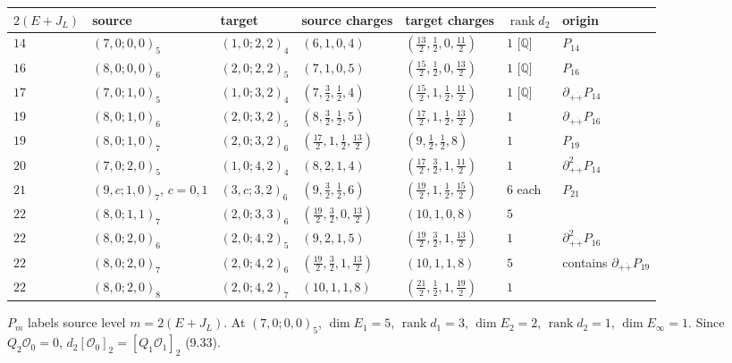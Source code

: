 \documentclass[11pt]{article}
\numberwithin{equation}{section}
\numberwithin{figure}{section}
\numberwithin{table}{section}
\begin{document}
{\small\renewcommand{\arraystretch}{1.25}\setlength{\tabcolsep}{4pt}
\begin{xltabular}{\linewidth}{@{}l>{\raggedright\arraybackslash}Xlllll@{}}
\toprule
$2(E+J_L)$ & source & target & source charges & target charges & $\operatorname{rank}d_2$ & origin\\
\midrule\endhead
$14$ & $(7,0;0,0)_5$ & $(1,0;2,2)_4$ & $(6,1,0,4)$ & $(\tfrac{13}2,\tfrac12,0,\tfrac{11}2)$ & $1$ [$\mathbb Q$] & $P_{14}$\\
$16$ & $(8,0;0,0)_6$ & $(2,0;2,2)_5$ & $(7,1,0,5)$ & $(\tfrac{15}2,\tfrac12,0,\tfrac{13}2)$ & $1$ [$\mathbb Q$] & $P_{16}$\\
$17$ & $(7,0;1,0)_5$ & $(1,0;3,2)_4$ & $(7,\tfrac32,\tfrac12,4)$ & $(\tfrac{15}2,1,\tfrac12,\tfrac{11}2)$ & $1$ [$\mathbb Q$] & $\partial_{+\dot+}P_{14}$\\
$19$ & $(8,0;1,0)_6$ & $(2,0;3,2)_5$ & $(8,\tfrac32,\tfrac12,5)$ & $(\tfrac{17}2,1,\tfrac12,\tfrac{13}2)$ & $1$ & $\partial_{+\dot+}P_{16}$\\
$19$ & $(8,0;1,0)_7$ & $(2,0;3,2)_6$ & $(\tfrac{17}2,1,\tfrac12,\tfrac{13}2)$ & $(9,\tfrac12,\tfrac12,8)$ & $1$ & $P_{19}$\\
$20$ & $(7,0;2,0)_5$ & $(1,0;4,2)_4$ & $(8,2,1,4)$ & $(\tfrac{17}2,\tfrac32,1,\tfrac{11}2)$ & $1$ & $\partial_{+\dot+}^2P_{14}$\\
$21$ & $(9,c;1,0)_7$, $c=0,1$ & $(3,c;3,2)_6$ & $(9,\tfrac32,\tfrac12,6)$ & $(\tfrac{19}2,1,\tfrac12,\tfrac{15}2)$ & $6$ each & $P_{21}$\\
$22$ & $(8,0;1,1)_7$ & $(2,0;3,3)_6$ & $(\tfrac{19}2,\tfrac32,0,\tfrac{13}2)$ & $(10,1,0,8)$ & $5$ & \\
$22$ & $(8,0;2,0)_6$ & $(2,0;4,2)_5$ & $(9,2,1,5)$ & $(\tfrac{19}2,\tfrac32,1,\tfrac{13}2)$ & $1$ & $\partial_{+\dot+}^2P_{16}$\\
$22$ & $(8,0;2,0)_7$ & $(2,0;4,2)_6$ & $(\tfrac{19}2,\tfrac32,1,\tfrac{13}2)$ & $(10,1,1,8)$ & $5$ & contains $\partial_{+\dot+}P_{19}$\\
$22$ & $(8,0;2,0)_8$ & $(2,0;4,2)_7$ & $(10,1,1,8)$ & $(\tfrac{21}2,\tfrac12,1,\tfrac{19}2)$ & $1$ & \\
\bottomrule
\end{xltabular}}

$P_m$ labels source level $m=2(E+J_L)$. At $(7,0;0,0)_5$, $\dim E_1=5$, $\operatorname{rank}d_1=3$, $\dim E_2=2$, $\operatorname{rank}d_2=1$, $\dim E_\infty=1$. Since $Q_2\mathcal O_0=0$, $d_2[\mathcal O_0]_2=[Q_1\mathcal O_1]_2$ (9.33).
\end{document}
